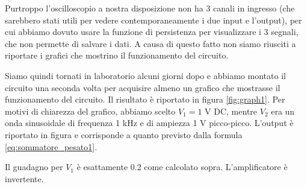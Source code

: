 Purtroppo l'oscilloscopio a nostra disposizione non ha 3 canali in ingresso (che sarebbero
stati utili per vedere contemporaneamente i due input e l'output), per cui abbiamo dovuto
usare la funzione di persistenza per visualizzare i 3 segnali, che non permette di salvare i dati.
A causa di questo fatto non siamo riusciti a riportare i grafici che mostrino il funzionamento
del circuito.

Siamo quindi tornati in laboratorio alcuni giorni dopo e abbiamo montato il circuito una seconda
volta per acquisire almeno un grafico che mostrasse il funzionamento del circuito.
Il risultato è riportato in figura \ref{fig:graph1}. Per motivi di chiarezza del grafico, abbiamo
scelto $V_1 = 1$ V DC, mentre $V_2$ era un onda sinusoidale di frequenza 1 kHz e di ampiezza 1 V
picco-picco. L'output è riportato in figura e corrisponde a quanto previsto dalla
formula \eqref{eq:sommatore_pesato1}.

Il guadagno per $V_1$ è esattamente 0.2 come calcolato sopra. L'amplificatore è invertente.